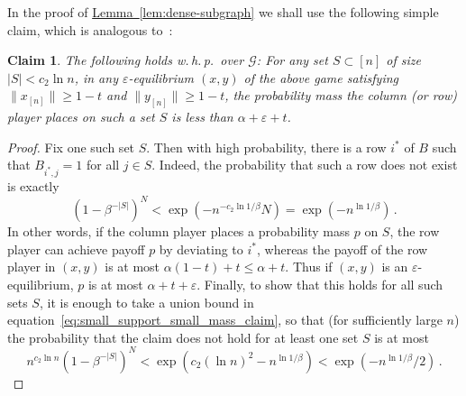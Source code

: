 \documentclass[10pt]{article}
\newtheorem{claim}[theorem]{Claim}
\theoremstyle{definition}
\numberwithin{equation}{section}
\newcommand{\expref}[2]{\texorpdfstring{\hyperref[#2]{#1~\ref{#2}}}{#1~\ref{#2}}}
\newcommand{\eps}{\varepsilon}
\newcommand{\G}{\mathcal{G}}
\begin{document}
In the proof of \expref{Lemma}{lem:dense-subgraph} we shall use the
following simple claim, which is analogous to~\cite[Claim 5.3]{HK11}:

\begin{claim}
  \label{claim:small_support_means_small_mass}
  The following holds w.\,h.\,p.\ over $\G$: For any set $S\subset[n]$ of size $|S| < c_2 \ln n$,
  in any $\eps$-equilibrium $(x,y)$ of the above
  game satisfying $\|x_{[n]}\| \ge 1-t$ and $\|y_{[n]}\| \ge 1-t$, the
  probability mass the column (or row) player places on such a set
  $S$ is less than $\alpha + \eps + t$.
\end{claim}

\begin{proof}
  Fix one such set $S$. Then with high
  probability, there is a row $i^*$ of $B$ such that $B_{i^*,j} = 1$ for all
  $j \in S$.  Indeed, the probability that such a row does not exist is
  exactly
  \begin{equation}\label{eq:small_support_small_mass_claim}
  \left(1 - \beta^{-|S|}\right)^N < \exp(-n^{-c_2 \ln 1/\beta} N) =
  \exp(-n^{\ln 1/\beta})\,.
  \end{equation} In other words, if the column player places a probability mass
  $p$ on $S$, the row player can achieve payoff $p$ by deviating to
  $i^*$, whereas the payoff of the row player in $(x,y)$ is at most
  $\alpha (1-t) + t \le \alpha + t$.  Thus if $(x,y)$ is an
  $\eps$-equilibrium, $p$ is at most $\alpha + t + \eps$. Finally, to show that this holds for all such sets $S$, it is enough to take a union bound in equation~\eqref{eq:small_support_small_mass_claim}, so that (for sufficiently large $n$) the probability that the claim does not hold for at least one set $S$ is at most
  $$n^{c_2\ln n}\left(1 - \beta^{-|S|}\right)^N < 
  \exp(c_2(\ln n)^2-n^{\ln 1/\beta}) < \exp(-n^{\ln 1/\beta}/2)\,.$$
\end{proof}



%
%
%
%
%
%
%
%
%
%
\end{document}

